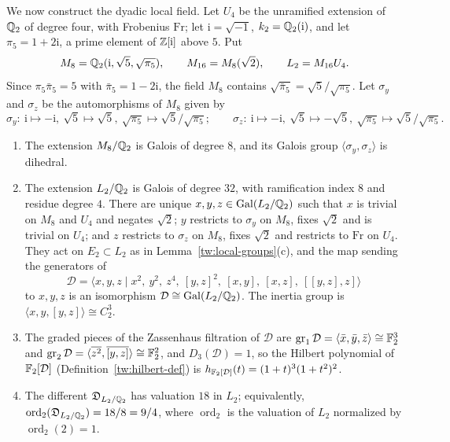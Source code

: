 We now construct the dyadic local field. Let $U_4$ be the
unramified extension of $\mathbb Q_2$ of degree four, with Frobenius $\mathrm{Fr}$;
let $\mathrm i=\sqrt{-1}$, $k_2=\mathbb Q_2(\mathrm i)$, and let
$\pi_5=1+2\mathrm i$, a prime element of $\mathbb Z[\mathrm i]$ above $5$. Put
\[
 M_8=\mathbb Q_2(\mathrm i,\sqrt5,\sqrt{\pi_5}),\qquad M_{16}=M_8(\sqrt2),\qquad
 L_2=M_{16}U_4 .
\]
Since $\pi_5\bar\pi_5=5$ with $\bar\pi_5=1-2\mathrm i$, the field $M_8$ contains
$\sqrt{\bar\pi_5}=\sqrt5/\sqrt{\pi_5}$. Let $\sigma_y$ and $\sigma_z$ be the
automorphisms of $M_8$ given by
\[
 \sigma_y:\ \mathrm i\mapsto-\mathrm i,\ \sqrt5\mapsto\sqrt5,\ \sqrt{\pi_5}\mapsto\sqrt5/\sqrt{\pi_5};
 \qquad
 \sigma_z:\ \mathrm i\mapsto-\mathrm i,\ \sqrt5\mapsto-\sqrt5,\ \sqrt{\pi_5}\mapsto\sqrt5/\sqrt{\pi_5}.
\]

\begin{lemma}\label{tw:local-two}
\begin{enumerate}
\item[(a)] The extension $M_8/\mathbb Q_2$ is Galois of degree $8$, and its Galois
 group $\langle\sigma_y,\sigma_z\rangle$ is dihedral.
\item[(b)] The extension $L_2/\mathbb Q_2$ is Galois of degree $32$, with
 ramification index $8$ and residue degree $4$. There are unique
 $x,y,z\in\operatorname{Gal}(L_2/\mathbb Q_2)$ such that $x$ is trivial on $M_8$ and $U_4$ and
 negates $\sqrt2$; $y$ restricts to $\sigma_y$ on $M_8$, fixes $\sqrt2$ and
 is trivial on $U_4$; and $z$ restricts to $\sigma_z$ on $M_8$, fixes $\sqrt2$
 and restricts to $\mathrm{Fr}$ on $U_4$. They act on $E_2\subset L_2$ as in
 Lemma~\ref{tw:local-groups}(c), and the map sending the generators of
 \[
  \mathcal D=\langle x,y,z\mid x^2,\ y^2,\ z^4,\ [y,z]^2,\ [x,y],\ [x,z],\ [[y,z],z]\rangle
 \]
 to $x,y,z$ is an isomorphism $\mathcal D\cong\operatorname{Gal}(L_2/\mathbb Q_2)$. The inertia group is
 $\langle x,y,[y,z]\rangle\cong C_2^3$.
\item[(c)] The graded pieces of the Zassenhaus filtration of $\mathcal D$ are
 $\operatorname{gr}_1\mathcal D=\langle\bar x,\bar y,\bar z\rangle\cong\mathbb F_2^3$ and
 $\operatorname{gr}_2\mathcal D=\langle\overline{z^2},\overline{[y,z]}\rangle\cong\mathbb F_2^2$,
 and $D_3(\mathcal D)=1$, so the Hilbert polynomial of $\mathbb F_2[\mathcal D]$
 (Definition~\ref{tw:hilbert-def}) is $h_{\mathbb F_2[\mathcal D]}(t)=(1+t)^3(1+t^2)^2$.
\item[(d)] The different $\mathfrak D_{L_2/\mathbb Q_2}$ has valuation $18$ in $L_2$;
 equivalently, $\operatorname{ord}_2(\mathfrak D_{L_2/\mathbb Q_2})=18/8=9/4$, where
 $\operatorname{ord}_2$ is the valuation of $L_2$ normalized by
 $\operatorname{ord}_2(2)=1$.
\end{enumerate}
\end{lemma}

